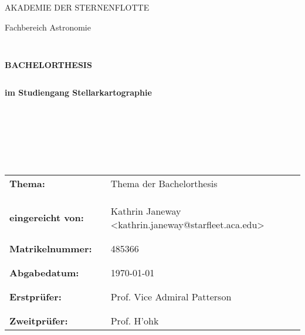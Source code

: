 \begin{titlepage}
	\begin{center}
		\uppercase{\large Akademie der Sternenflotte}\\
	\end{center}
	\begin{center}
		\large Fachbereich Astronomie
	\end{center}
	\begin{verbatim}


	\end{verbatim}
	\begin{center}
		\uppercase{\textbf{\large Bachelorthesis}}
	\end{center}
	\begin{verbatim}
	\end{verbatim}
	\begin{center}
		\textbf{im Studiengang Stellarkartographie}
	\end{center}
	\begin{verbatim}







	\end{verbatim}
	\begin{flushleft}
		\begin{tabular}{lll}
			\textbf{Thema:} & & {Thema der Bachelorthesis} \\
			& & \\
			& & \\
			& & \\
			\textbf{eingereicht von:} & & Kathrin Janeway <kathrin.janeway@starfleet.aca.edu>\\
			& & \\
			& & \\
			\textbf{Matrikelnummer:} & & 485366\\
			& & \\
			& & \\
			\textbf{Abgabedatum:} & & \today\\
			& & \\
			& & \\
			\textbf{Erstprüfer:} & & Prof. Vice Admiral Patterson \\
			& & \\
			& & \\
			\textbf{Zweitprüfer:} & & Prof. H'ohk
		\end{tabular}
	\end{flushleft}
\end{titlepage}